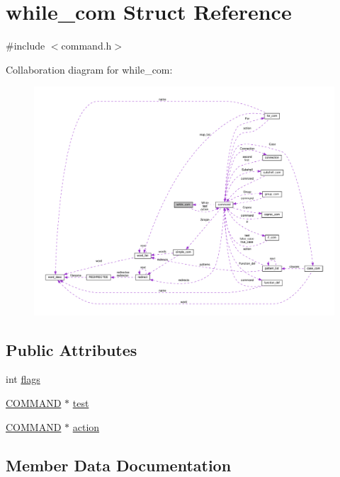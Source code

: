 \hypertarget{structwhile__com}{}\section{while\+\_\+com Struct Reference}
\label{structwhile__com}


{\ttfamily \#include $<$command.\+h$>$}



Collaboration diagram for while\+\_\+com\+:
\nopagebreak
\begin{figure}[H]
\begin{center}
\leavevmode
\includegraphics[width=350pt]{structwhile__com__coll__graph}
\end{center}
\end{figure}
\subsection*{Public Attributes}
\begin{DoxyCompactItemize}
\item 
int \hyperlink{structwhile__com_aeee869c9eb263491c5454c3c8c6b098a}{flags}
\item 
\hyperlink{command_8h_a8c41dec142c299806885773c902c0d87}{C\+O\+M\+M\+A\+ND} $\ast$ \hyperlink{structwhile__com_ab695c3ea48e16db8f9e7589fb56366f8}{test}
\item 
\hyperlink{command_8h_a8c41dec142c299806885773c902c0d87}{C\+O\+M\+M\+A\+ND} $\ast$ \hyperlink{structwhile__com_a8eaeeadd6e86e0a0a76144bf29a60b4d}{action}
\end{DoxyCompactItemize}


\subsection{Member Data Documentation}
